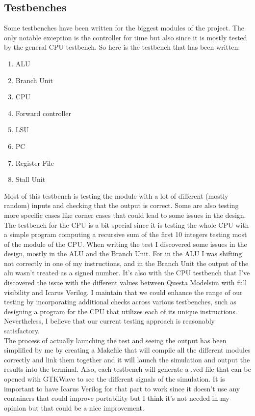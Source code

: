 \subsection{Testbenches}

Some testbenches have been written for the biggest modules of the project. The only notable exception is the 
controller for time but also since it is mostly tested by the general CPU testbench. So here is the testbench that has been written:

\begin{enumerate}[label={\textbullet}]
    \item ALU
    \item Branch Unit
    \item CPU
    \item Forward controller
    \item LSU
    \item PC
    \item Register File
    \item Stall Unit
\end{enumerate}

Most of this testbench is testing the module with a lot of different (mostly random) inputs and checking that the output is correct.
Some are also testing more specific cases like corner cases that could lead to some issues in the design. The testbench for the CPU is 
a bit special since it is testing the whole CPU with a simple program computing a recursive sum of the first 10 integers testing most 
of the module of the CPU.
When writing the test I discovered some issues in the design, mostly in the ALU and the Branch Unit. For in the ALU I was shifting 
not correctly in one of my instructions, and in the Branch Unit the output of the alu wasn't treated as a signed number.
It's also with the CPU testbench that I've discovered the issue with the different values between Questa Modelsim with full visibility and 
Icarus Verilog. 
I maintain that we could enhance the range of our testing by incorporating additional checks across various testbenches, such as designing 
a program for the CPU that utilizes each of its unique instructions. Nevertheless, I believe that our current testing approach is reasonably satisfactory. \\

The process of actually launching the test and seeing the output has been simplified by me by creating a Makefile that will compile all the 
different modules correctly and link them together and it will launch the simulation and output the results into the terminal. Also, each 
testbench will generate a .vcd file that can be opened with GTKWave to see the different signals of the simulation. It is important to have
Icarus Verilog for that part to work since it doesn't use any containers that could improve portability but I think it's not needed 
in my opinion but that could be a nice improvement.

